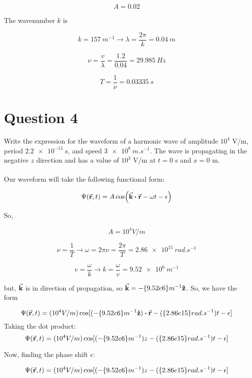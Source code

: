 \documentclass[a4paper]{article}
\begin{document}
\[
    A = 0.02
\]

The wavenumber $k$ is 

\[
    k = \qty{157}{m^{-1}} \rightarrow \lambda = \frac{2 \pi}{k} = \qty{0.04}{m}
\]

\[
    \nu = \frac{v}{\lambda} = \frac{1.2}{0.04} = \qty{29.985}{Hz}
\]

\[
    T = \frac{1}{\nu} = \qty{0.03335}{s}
\]

\section*{Question 4}
Write the expression for the waveform of a harmonic wave of amplitude $10^4$ V/m, period $\qty{2.2e-15}{s}$,
and speed $\qty{3e8}{m.s^{-1}}$. The wave is propagating in the negative $z$ direction and has a value of $10^3$ V/m
at $t = 0$ s and $x = 0$ m. \\\\

Our waveform will take the following functional form:

\[
    \Psi(\va{r}, t) = A \cos(\va{k} \vdot \va{r} - \omega t - \epsilon )
\]

So,

\[
    A = 10^4 V/m 
\]

\[
    \nu = \frac{1}{T} \rightarrow \omega = 2 \pi \nu = \frac{2 \pi}{T} = \qty{2.86e15}{rad.s^{-1}}
\]

\[
    v = \frac{\omega}{k} \rightarrow k = \frac{\omega}{v} = \qty{9.52e6}{m^{-1}}
\]

but, $\va{k}$ is in direction of propagation, so $\va{k} = -\qty{9.52e6}{m^{-1}} \vu{z}$. So, we have the form

\[
    \Psi(\va{r}, t) = (10^4 V/m ) \cos[(-\qty{9.52e6}{m^{-1}} \vu{z}) \vdot \va{r} - (\qty{2.86e15}{rad.s^{-1}}) t - \epsilon ]
\]
Taking the dot product:
\[
    \Psi(\va{r}, t) = (10^4 V/m ) \cos[(-\qty{9.52e6}{m^{-1}})z - (\qty{2.86e15}{rad.s^{-1}}) t - \epsilon ]
\]

Now, finding the phase shift $\epsilon$:

\[
    \Psi(\va{r}, t) = (10^4 V/m ) \cos[(-\qty{9.52e6}{m^{-1}})z - (\qty{2.86e15}{rad.s^{-1}}) t - \epsilon ]
\]
\end{document}
